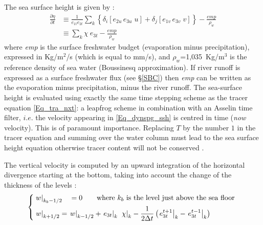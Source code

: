 \documentclass[NEMO_book]{subfiles}
\begin{document}
The sea surface height is given by :
\begin{equation} \label{Eq_dynspg_ssh}
\begin{aligned}
\frac{\partial \eta }{\partial t}
&\equiv    \frac{1}{e_{1t} e_{2t} }\sum\limits_k { \left\{  \delta _i \left[ {e_{2u}\,e_{3u}\;u} \right]
                                                                                  +\delta _j \left[ {e_{1v}\,e_{3v}\;v} \right]  \right\} } 
           -    \frac{\textit{emp}}{\rho _w }   \\
&\equiv    \sum\limits_k {\chi \ e_{3t}}  -  \frac{\textit{emp}}{\rho _w }
\end{aligned}
\end{equation}
where \textit{emp} is the surface freshwater budget (evaporation minus precipitation), 
expressed in Kg/m$^2$/s (which is equal to mm/s), and $\rho _w$=1,035~Kg/m$^3$ 
is the reference density of sea water (Boussinesq approximation). If river runoff is 
expressed as a surface freshwater flux (see \S\ref{SBC}) then \textit{emp} can be 
written as the evaporation minus precipitation, minus the river runoff. 
The sea-surface height is evaluated using exactly the same time stepping scheme 
as the tracer equation \eqref{Eq_tra_nxt}: 
a leapfrog scheme in combination with an Asselin time filter, $i.e.$ the velocity appearing 
in \eqref{Eq_dynspg_ssh} is centred in time (\textit{now} velocity). 
This is of paramount importance. Replacing $T$ by the number $1$ in the tracer equation and summing
over the water column must lead to the sea surface height equation otherwise tracer content
will not be conserved \citep{Griffies_al_MWR01, Leclair_Madec_OM09}.

The vertical velocity is computed by an upward integration of the horizontal 
divergence starting at the bottom, taking into account the change of the thickness of the levels :
\begin{equation} \label{Eq_wzv}
\left\{   \begin{aligned}
&\left. w \right|_{k_b-1/2} \quad= 0    \qquad \text{where } k_b \text{ is the level just above the sea floor }  	\\
&\left. w \right|_{k+1/2}     = \left. w \right|_{k-1/2}  +  \left. e_{3t} \right|_{k}\;  \left. \chi \right|_k  
                                         - \frac{1} {2 \Delta t} \left(  \left. e_{3t}^{t+1}\right|_{k} - \left. e_{3t}^{t-1}\right|_{k}\right)
\end{aligned}   \right.
\end{equation}
\end{document}
